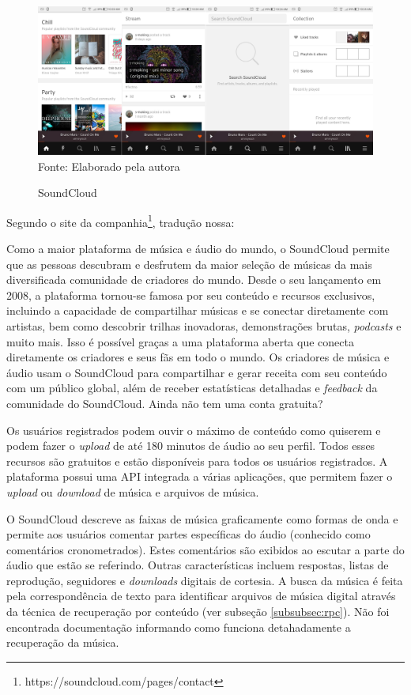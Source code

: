 \begin{figure}[!htb]
   \centering
   \caption{SoundCloud}\label{fig:soundcloud} 
   \includegraphics[scale=0.12]{figuras/soundcloud.jpg}
   \\Fonte: Elaborado pela autora
\end{figure}

Segundo o site da companhia\footnote{https://soundcloud.com/pages/contact}, tradução nossa:

\begin{citacao}
Como a maior plataforma de música e áudio do mundo, o SoundCloud permite que as pessoas descubram e desfrutem da maior seleção de músicas da mais diversificada comunidade de criadores do mundo. Desde o seu lançamento em 2008, a plataforma tornou-se famosa por seu conteúdo e recursos exclusivos, incluindo a capacidade de compartilhar músicas e se conectar diretamente com artistas, bem como descobrir trilhas inovadoras, demonstrações brutas, \textit{podcasts} e muito mais. Isso é possível graças a uma plataforma aberta que conecta diretamente os criadores e seus fãs em todo o mundo. Os criadores de música e áudio usam o SoundCloud para compartilhar e gerar receita com seu conteúdo com um público global, além de receber estatísticas detalhadas e \textit{feedback} da comunidade do SoundCloud. Ainda não tem uma conta gratuita? \cite{soundcloud2007}
\end{citacao}

Os usuários registrados podem ouvir o máximo de conteúdo como quiserem e podem fazer o \textit{upload} de até 180 minutos de áudio ao seu perfil. Todos esses recursos são gratuitos e estão disponíveis para todos os usuários registrados. A plataforma possui uma API integrada a várias aplicações, que permitem fazer o \textit{upload} ou \textit{download} de música e arquivos de música.

O SoundCloud descreve as faixas de música graficamente como formas de onda e permite aos usuários comentar partes específicas do áudio (conhecido como comentários cronometrados). Estes comentários são exibidos ao escutar a parte do áudio que estão se referindo. Outras características incluem respostas, listas de reprodução, seguidores e \textit{downloads} digitais de cortesia. A busca da música é feita pela correspondência de texto para identificar arquivos de música digital através da técnica de recuperação por conteúdo (ver subseção \ref{subsubsec:rpc}). Não foi encontrada documentação informando como funciona detahadamente a recuperação da música.

